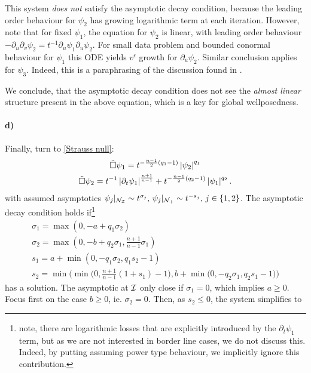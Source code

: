 \documentclass[11pt, oneside]{amsart}
\begin{document}
	This system \textit{does not} satisfy the asymptotic decay condition, because the leading order behaviour for $\psi_2$ has growing logarithmic term at each iteration. However, note that for fixed $\psi_1$, the equation for $\psi_2$ is linear, with leading order behaviour $-\partial_u\partial_v\psi_2=t^{-1}\partial_u\psi_1\partial_u\psi_2$. For small data problem and bounded conormal behaviour for $\psi_1$ this ODE yields $v^\epsilon$ growth for $\partial_u\psi_2$. Similar conclusion applies for $\psi_3$. Indeed, this is a paraphrasing of the discussion found in \cite{keir_weak_2018}.
	
	We conclude, that the asymptotic decay condition does not see the \textit{almost linear} structure present in the above equation, which is a key for global wellposedness.

	
	\paragraph{d)} Finally, turn to \eqref{Strauss null}:
	\begin{equation*}
		\begin{gathered}
			\tilde{\Box}\psi_1=t^{-\frac{n-1}{2}(q_1-1)}\left\lvert \psi_2\right\rvert^{q_1}\\
			\tilde{\Box}\psi_2=t^{-1}\left\lvert \partial_t\psi_1\right\rvert^{\frac{n+1}{n-1}}+t^{-\frac{n-1}{2}(q_2-1)}\left\lvert \psi_1\right\rvert^{q_2}	.
		\end{gathered}
	\end{equation*}
	with assumed asymptotics $\psi_j|_{\mathcal{N}_{\mathcal{I}}}\sim t^{\sigma_j},\,\psi_j|_{\mathcal{N}_+}\sim t^{-s_j},\, j\in\{1,2\}$. The asymptotic decay condition holds if\footnote{note, there are logarithmic losses that are explicitly introduced by the $\partial_t\psi_1$ term, but as we are not interested in border line cases, we do not discuss this. Indeed, by putting assuming power type behaviour, we implicitly ignore this contribution.}
	\begin{equation*}
		\begin{gathered}
			\sigma_1=\max(0,-a+q_1\sigma_2)\\
			\sigma_2=\max(0,-b+q_2\sigma_1,\frac{n+1}{n-1}\sigma_1)\\
			s_1=a+\min(0,-q_1\sigma_2,q_1s_2-1)\\
			s_2=\min\bigg(\min\Big(0,\frac{n+1}{n-1}(1+s_1)-1\Big),b+\min\Big(0,-q_2\sigma_1,q_2s_1-1\Big)\bigg)
		\end{gathered}
	\end{equation*}
	has a solution. The asymptotic at $\mathcal{I}$ only close if $\sigma_1=0$, which implies $a\geq0$. Focus first on the case $b\geq0$, ie. $\sigma_2=0$. Then, as $s_2\leq0$, the system simplifies to
\end{document}
